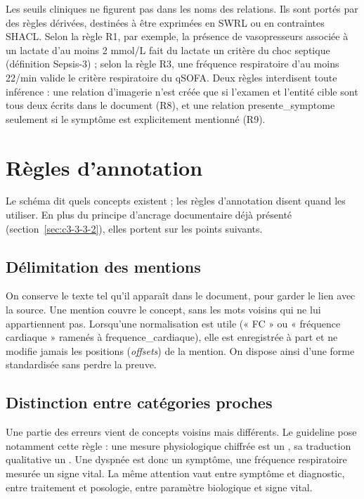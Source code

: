 Les seuils cliniques ne figurent pas dans les noms des relations. Ils sont portés par des règles dérivées, destinées à être exprimées en SWRL ou en contraintes SHACL. Selon la règle R1, par exemple, la présence de vasopresseurs associée à un lactate d’au moins 2 mmol/L fait du lactate un critère du choc septique (définition Sepsis-3) ; selon la règle R3, une fréquence respiratoire d’au moins 22/min valide le critère respiratoire du qSOFA. Deux règles interdisent toute inférence : une relation d’imagerie n’est créée que si l’examen et l’entité cible sont tous deux écrits dans le document (R8), et une relation presente\_symptome seulement si le symptôme est explicitement mentionné (R9).

\section{Règles d’annotation}\label{sec:c3-3-6}

Le schéma dit quels concepts existent ; les règles d’annotation disent quand les utiliser. En plus du principe d’ancrage documentaire déjà présenté (section~\ref{sec:c3-3-3-2}), elles portent sur les points suivants.

\subsection{Délimitation des mentions}\label{sec:c3-3-6-1}

On conserve le texte tel qu’il apparaît dans le document, pour garder le lien avec la source. Une mention couvre le concept, sans les mots voisins qui ne lui appartiennent pas. Lorsqu’une normalisation est utile (« FC » ou « fréquence cardiaque » ramenés à frequence\_cardiaque), elle est enregistrée à part et ne modifie jamais les positions (\emph{offsets}) de la mention. On dispose ainsi d’une forme standardisée sans perdre la preuve.

\subsection{Distinction entre catégories proches}\label{sec:c3-3-6-2}

Une partie des erreurs vient de concepts voisins mais différents. Le guideline pose notamment cette règle : une mesure physiologique chiffrée est un , sa traduction qualitative un . Une dyspnée est donc un symptôme, une fréquence respiratoire mesurée un signe vital. La même attention vaut entre symptôme et diagnostic, entre traitement et posologie, entre paramètre biologique et signe vital.

